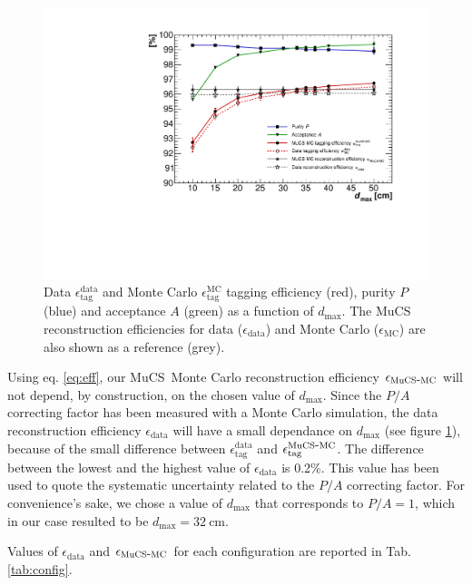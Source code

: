 \documentclass[a4paper]{scrartcl}
\def\myhyphen{{\hbox{-}}}
\begin{document}
\begin{figure}[htbp]
  \begin{center}
    \includegraphics[width=0.7\linewidth]{figures/purity.pdf}
    \caption{Data $\epsilon^{\mathrm{data}}_{\mathrm{tag}}$ and Monte Carlo $\epsilon^{\mathrm{MC}}_{\mathrm{tag}}$ tagging efficiency (red), purity $P$ (blue) and acceptance $A$ (green) as a function of $d_{\mathrm{max}}$. The MuCS reconstruction efficiencies for data ($\epsilon_{\mathrm{data}}$) and Monte Carlo ($\epsilon_{\mathrm{MC}}$) are also shown as a reference (grey).} \label{fig:purity}
  \end{center}
\end{figure}

Using eq. \eqref{eq:eff}, our MuCS Monte Carlo reconstruction efficiency $\epsilon_{\mathrm{MuCS\myhyphen MC}}$ will not depend, by construction, on the chosen value of $d_{\mathrm{max}}$. Since the $P/A$ correcting factor has been measured with a Monte Carlo simulation, the data reconstruction efficiency $\epsilon_{\mathrm{data}}$ will have a small dependance on $d_{\mathrm{max}}$ (see figure \ref{fig:purity}), because of the small difference between $\epsilon^{\mathrm{data}}_{\mathrm{tag}}$ and $\epsilon^{\mathrm{MuCS\myhyphen MC}}_{\mathrm{tag}}$.
The difference between the lowest and the highest value of $\epsilon_{\mathrm{data}}$ is 0.2\%. This value has been used to quote the systematic uncertainty related to the $P/A$ correcting factor.
For convenience's sake, we chose a value of $d_{\mathrm{max}}$ that corresponds to $P/A = 1$, which in our case resulted to be $d_{\mathrm{max}}=32~\mathrm{cm}$.

Values of $\epsilon_{\mathrm{data}}$ and $\epsilon_{\mathrm{MuCS\myhyphen MC}}$ for each configuration are reported in Tab. \ref{tab:config}.
\end{document}

